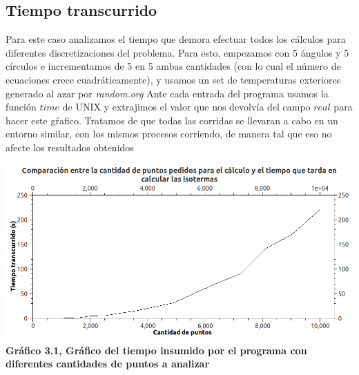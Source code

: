 \subsection{Tiempo transcurrido}

Para este caso analizamos el tiempo que demora efectuar todos los cálculos para diferentes discretizaciones del problema. Para esto, empezamos con 5 ángulos y 5 círculos e incrementamos de 5 en 5 ambas cantidades (con lo cual el número de ecuaciones crece cuadráticamente), y usamos un set de temperaturas exteriores generado al azar por \textit{random.org} Ante cada entrada del programa usamos la función $time$ de UNIX y extrajimos el valor que nos devolvía del campo $real$ para hacer este gŕafico. Tratamos de que todas las corridas se llevaran a cabo en un entorno similar, con los mismos procesos corriendo, de manera tal que eso no afecte los resultados obtenidos

\vspace{2cm}

\begin{center}
\includegraphics[scale=0.55]{../img/Grafico.png} \\
\scriptsize{\textsf{\textbf{Gr\'afico 3.1, Gráfico del tiempo insumido por el programa con diferentes cantidades de puntos a analizar}}}
\end{center}
%
%


